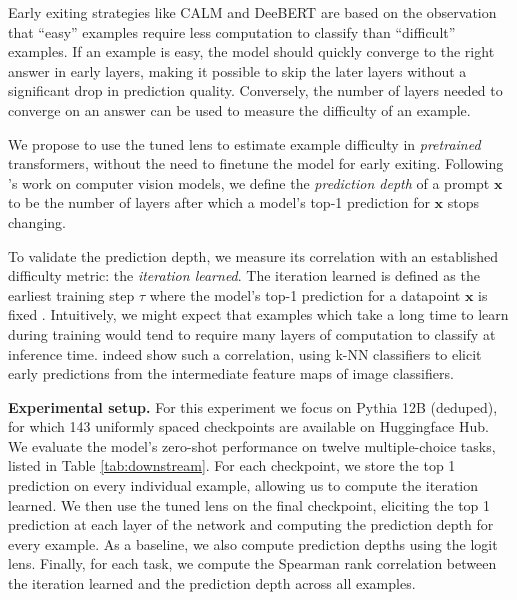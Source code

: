 \documentclass{article}
\theoremstyle{plain}
\theoremstyle{definition}
\newcommand{\xx}{\boldsymbol x} %
\begin{document}
Early exiting strategies like CALM \citep{schuster2022confident} and DeeBERT \citep{xin2020deebert} are based on the observation that ``easy'' examples require less computation to classify than ``difficult'' examples. If an example is easy, the model should quickly converge to the right answer in early layers, making it possible to skip the later layers without a significant drop in prediction quality. Conversely, the number of layers needed to converge on an answer can be used to measure the difficulty of an example.

We propose to use the tuned lens to estimate example difficulty in \emph{pretrained} transformers, without the need to finetune the model for early exiting. Following \citet{baldock2021deep}'s work on computer vision models, we define the \emph{prediction depth} of a prompt $\xx$ to be the number of layers after which a model's top-1 prediction for $\xx$ stops changing.

To validate the prediction depth, we measure its correlation with an established difficulty metric: the \emph{iteration learned}. The iteration learned is defined as the earliest training step $\tau$ where the model's top-1 prediction for a datapoint $\xx$ is fixed \citep{toneva2018empirical}. Intuitively, we might expect that examples which take a long time to learn during training would tend to require many layers of computation to classify at inference time. \citet{baldock2021deep} indeed show such a correlation, using k-NN classifiers to elicit early predictions from the intermediate feature maps of image classifiers. 

\textbf{Experimental setup.} For this experiment we focus on Pythia 12B (deduped), for which 143 uniformly spaced checkpoints are available on Huggingface Hub. We evaluate the model's zero-shot performance on twelve multiple-choice tasks, listed in Table \ref{tab:downstream}. For each checkpoint, we store the top 1 prediction on every individual example, allowing us to compute the iteration learned. We then use the tuned lens on the final checkpoint, eliciting the top 1 prediction at each layer of the network and computing the prediction depth for every example. As a baseline, we also compute prediction depths using the logit lens. Finally, for each task, we compute the Spearman rank correlation between the iteration learned and the prediction depth across all examples.
\end{document}
